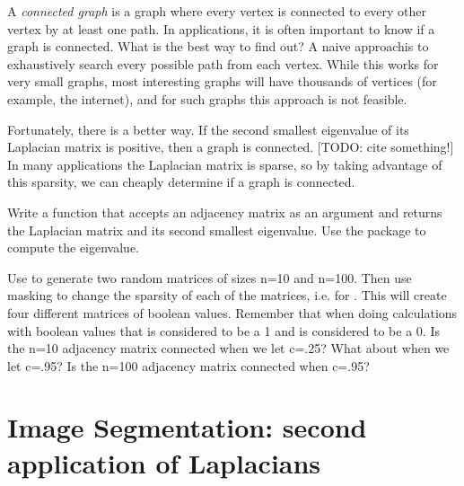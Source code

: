 A \emph{connected graph} is a graph where every vertex is connected to every other vertex by at least one path.
In applications, it is often important to know if a graph is connected.
What is the best way to find out?
A naive approachis to exhaustively search every possible path from each vertex.
While this works for very small graphs, most interesting graphs will have thousands of vertices (for example, the internet), and for such graphs this approach is not feasible.

Fortunately, there is a better way.
If the second smallest eigenvalue of its Laplacian matrix is positive, then a graph is connected. [TODO: cite something!]
In many applications the Laplacian matrix is sparse, so by taking advantage of this sparsity, we can cheaply determine if a graph is connected.

\begin{problem}Write a function  that accepts an adjacency matrix as an argument and returns the Laplacian matrix and its second smallest eigenvalue.
Use the  package to compute the eigenvalue.

Use  to generate two random matrices of sizes n=10 and n=100.
Then use masking to change the sparsity of each of the matrices, i.e.  for . This will create four different matrices of boolean values. Remember that when doing calculations with boolean values that  is considered to be a 1 and  is considered to be a 0. Is the n=10 adjacency matrix connected when we let c=.25? What about when we let c=.95? Is the n=100 adjacency matrix connected when c=.95?
\end{problem}


\section*{Image Segmentation: second application of Laplacians}

